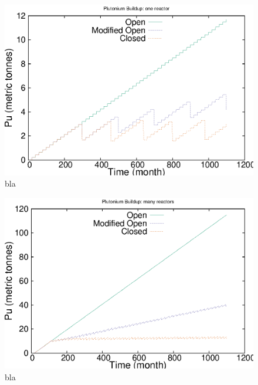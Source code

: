 
\begin{figure}[!]
\label{fig:puseries-1}
\caption{bla}
\begin{center}
\includegraphics{./images/puseries-1.eps}
\end{center}
\end{figure}

\begin{figure}[!]
\label{fig:puseries-n}
\caption{bla}
\begin{center}
\includegraphics{./images/puseries-n.eps}
\end{center}
\end{figure}

